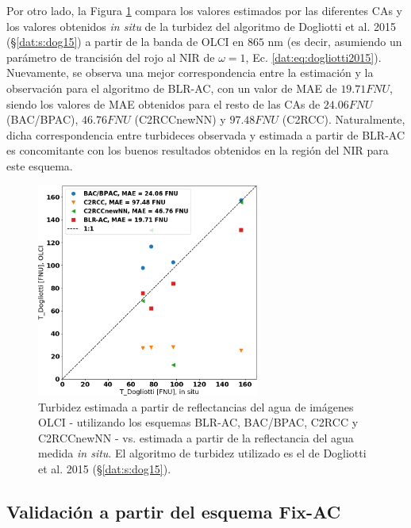             Por otro lado, la Figura \ref{blr:matchups_T} compara los valores estimados por las diferentes CAs y los valores obtenidos \textit{in situ} de la turbidez del algoritmo de Dogliotti et al. 2015 (\S \ref{dat:s:dog15}) a partir de la banda de OLCI en $865$ nm (es decir, asumiendo un parámetro de trancisión del rojo al NIR de $\omega=1$, Ec. \ref{dat:eq:dogliotti2015}). Nuevamente, se observa una mejor correspondencia entre la estimación y la observación para el algoritmo de BLR-AC, con un valor de MAE de $19.71 FNU$, siendo los valores de MAE obtenidos para el resto de las CAs de $24.06 FNU$ (BAC/BPAC), $46.76 FNU$ (C2RCCnewNN) y $97.48 FNU$ (C2RCC). Naturalmente, dicha correspondencia entre turbideces observada y estimada a partir de BLR-AC es concomitante con los buenos resultados obtenidos en la región del NIR para este esquema.
            
            \begin{figure}
            \centering
            \includegraphics[width=0.65\textwidth]{blr/figures/matchups_T.png}
            \caption[Turbidez (Dogliotti et al. 2015) estimada a partir de reflectancias del agua de imágenes OLCI - utilizando los esquemas BLR-AC, BAC/BPAC, C2RCC y C2RCCnewNN - vs. estimada a partir de la reflectancia del agua medida \textit{in situ}.]{Turbidez estimada a partir de reflectancias del agua de imágenes OLCI - utilizando los esquemas BLR-AC, BAC/BPAC, C2RCC y C2RCCnewNN - vs. estimada a partir de la reflectancia del agua medida \textit{in situ}. El algoritmo de turbidez utilizado es el de Dogliotti et al. 2015 (\S \ref{dat:s:dog15}).}
            \label{blr:matchups_T}
            \end{figure}

        \subsection{Validación a partir del esquema Fix-AC}
        \label{blr:s:results:blrac:fixac}
        
